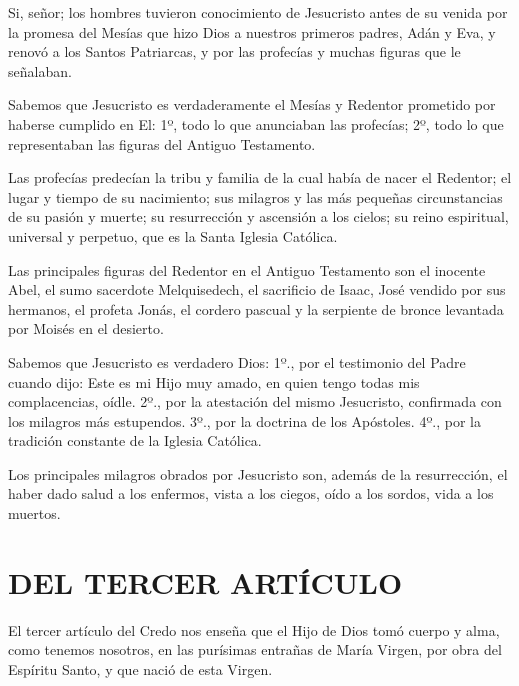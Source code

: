  Si, señor; los hombres tuvieron conocimiento de Jesucristo antes de su
venida por la promesa del Mesías que hizo Dios a nuestros primeros padres, Adán
y Eva, y renovó a los Santos Patriarcas, y por las profecías y muchas figuras que le
señalaban.

 Sabemos que Jesucristo es verdaderamente el Mesías y
Redentor prometido por haberse cumplido en El: 1º, todo lo que anunciaban las
profecías; 2º, todo lo que representaban las figuras del Antiguo Testamento.

 Las profecías
predecían la tribu y familia de la cual había de nacer el Redentor; el lugar y tiempo de su nacimiento; sus milagros y las más pequeñas circunstancias de su pasión y muerte; su resurrección y ascensión a los cielos; su reino espiritual, universal y perpetuo, que es la Santa Iglesia Católica.

 Las principales figuras del Redentor en el Antiguo Testamento
son el inocente Abel, el sumo sacerdote Melquisedech, el sacrificio de Isaac, José
vendido por sus hermanos, el profeta Jonás, el cordero pascual y la serpiente de
bronce levantada por Moisés en el desierto.

 Sabemos que
Jesucristo es verdadero Dios: 1º., por el testimonio del Padre cuando dijo: Este es
mi Hijo muy amado, en quien tengo todas mis complacencias, oídle. 2º., por la
atestación del mismo Jesucristo, confirmada con los milagros más estupendos. 3º.,
por la doctrina de los Apóstoles. 4º., por la tradición constante de la Iglesia
Católica.

 Los
principales milagros obrados por Jesucristo son, además de la resurrección, el
haber dado salud a los enfermos, vista a los ciegos, oído a los sordos, vida a los
muertos.

\section{DEL TERCER ARTÍCULO}

 El tercer artículo del Credo nos enseña que el Hijo de Dios tomó
cuerpo y alma, como tenemos nosotros, en las purísimas entrañas de María
Virgen, por obra del Espíritu Santo, y que nació de esta Virgen.

